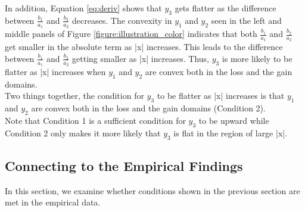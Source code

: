 \documentclass[11pt, a4paper]{article}
\begin{document}
\noindent
In addition, Equation \ref{eq:deriv} shows that $y_3$ gets flatter as the difference between $\frac{b_1}{a_1}$ and $\frac{b_2}{a_2}$ decreases.  The convexity in $y_1$ and $y_2$ seen in the left and middle panels of Figure \ref{figure:illustration_color} indicates that both $\frac{b_1}{a_1}$ and $\frac{b_2}{a_2}$ get smaller in the absolute term as |x| increases. This leads to the difference between $\frac{b_1}{a_1}$ and $\frac{b_2}{a_2}$ getting smaller as |x| increases. Thus, $y_3$ is more likely to be flatter as |x| increases when $y_1$ and $y_2$ are convex both in the loss and the gain domains.\\

\noindent
Two things together, the condition for $y_3$ to be flatter as |x| increases is that $y_1$ and $y_2$ are convex both in the loss and the gain domains (Condition 2). \\

\noindent
Note that Condition 1 is a sufficient condition for $y_3$ to be upward while Condition 2 only makes it more likely that $y_3$ is flat in the region of large |x|.\\

\subsection{Connecting to the Empirical Findings}
\label{section:emp_cond}
In this section, we examine whether conditions shown in the previous section are met in the empirical data.


\end{document}

